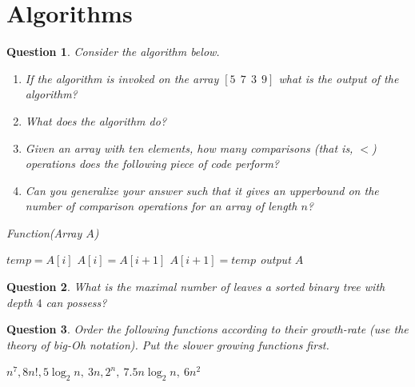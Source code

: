 \documentclass[13pt,a4paper]{article}
\newtheorem{question}{Question}
\begin{document}
\section{Algorithms}

\begin{question} 
Consider the algorithm below.
\begin{enumerate}
\item
If the algorithm is invoked on the array $[ 5~~ 7~~ 3~~ 9]$ what is the output of the algorithm?
\item
What does the algorithm do? 
\item
Given an array with ten elements, how many comparisons (that is, $<$) operations does the following piece of code perform?  
\item
Can you generalize your answer such that it gives an upperbound on the number of comparison operations for an array of length $n$?
\end{enumerate}

\begin{algorithm}[ht]
\caption{Function(Array $A$)}
\begin{algorithmic}
  \STATE $temp = A[i]$
  \STATE $A[i] = A[i+1]$
  \STATE $A[i+1] = temp$
  \ENDIF
  \ENDFOR
  \ENDFOR
  \STATE output $A$
\end{algorithmic}
\end{algorithm}
\end{question}





\begin{question}
What is the maximal number of leaves a sorted binary tree with depth $4$ can possess?
\end{question}


\begin{question}
Order the following functions according to their growth-rate (use the theory of big-Oh notation). Put the slower growing functions first.


$ n^7, 8n!, 5 \log_2 n,~ 3n, 2^n, ~ 7.5 n\log_2 n, ~ 6 n^2$ 

\end{question}
\end{document}
